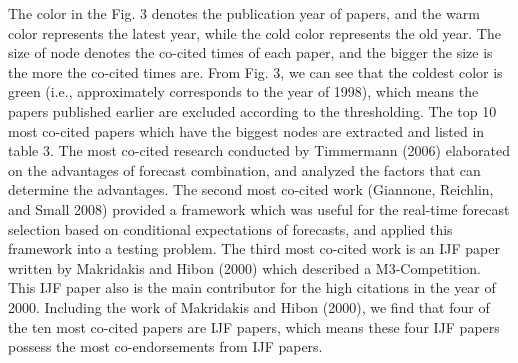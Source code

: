 \documentclass[11pt,a4paper]{elsarticle} %
\begin{document}
The color in the Fig. 3 denotes the publication year of papers, and the
warm color represents the latest year, while the cold color represents
the old year. The size of node denotes the co-cited times of each paper,
and the bigger the size is the more the co-cited times are. From Fig. 3,
we can see that the coldest color is green (i.e., approximately
corresponds to the year of 1998), which means the papers published
earlier are excluded according to the thresholding. The top 10 most
co-cited papers which have the biggest nodes are extracted and listed in
table 3. The most co-cited research conducted by Timmermann (2006)
elaborated on the advantages of forecast combination, and analyzed the
factors that can determine the advantages. The second most co-cited work
(Giannone, Reichlin, and Small 2008) provided a framework which was
useful for the real-time forecast selection based on conditional
expectations of forecasts, and applied this framework into a testing
problem. The third most co-cited work is an IJF paper written by
Makridakis and Hibon (2000) which described a M3-Competition. This IJF
paper also is the main contributor for the high citations in the year of
2000. Including the work of Makridakis and Hibon (2000), we find that
four of the ten most co-cited papers are IJF papers, which means these
four IJF papers possess the most co-endorsements from IJF papers.
\end{document}
